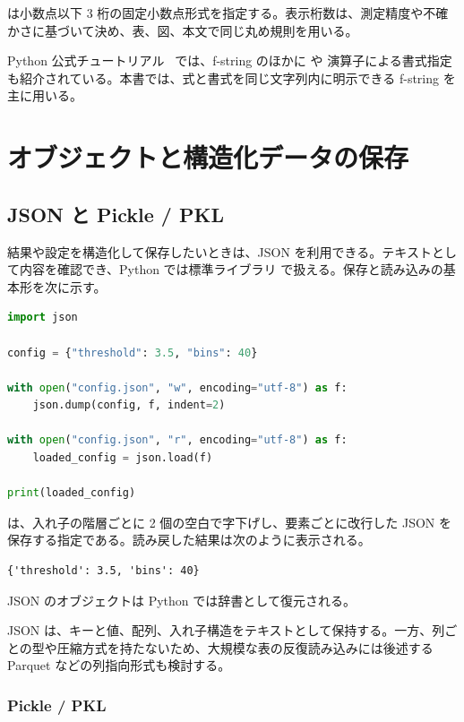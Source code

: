  は小数点以下 3 桁の固定小数点形式を指定する。表示桁数は、測定精度や不確かさに基づいて決め、表、図、本文で同じ丸め規則を用いる。

Python 公式チュートリアル~\cite{python_tutorial} では、f-string のほかに  や \code{\%} 演算子による書式指定も紹介されている。本書では、式と書式を同じ文字列内に明示できる f-string を主に用いる。

\section{オブジェクトと構造化データの保存}

\subsection{JSON と Pickle / PKL}

結果や設定を構造化して保存したいときは、JSON を利用できる。テキストとして内容を確認でき、Python では標準ライブラリ  で扱える。保存と読み込みの基本形を次に示す。

\begin{lstlisting}[language=Python]
import json

config = {"threshold": 3.5, "bins": 40}

with open("config.json", "w", encoding="utf-8") as f:
    json.dump(config, f, indent=2)

with open("config.json", "r", encoding="utf-8") as f:
    loaded_config = json.load(f)

print(loaded_config)
\end{lstlisting}

 は、入れ子の階層ごとに 2 個の空白で字下げし、要素ごとに改行した JSON を保存する指定である。読み戻した結果は次のように表示される。

\begin{lstlisting}[numbers=none, xleftmargin=2\zw]
{'threshold': 3.5, 'bins': 40}
\end{lstlisting}

JSON のオブジェクトは Python では辞書として復元される。

JSON は、キーと値、配列、入れ子構造をテキストとして保持する。一方、列ごとの型や圧縮方式を持たないため、大規模な表の反復読み込みには後述する Parquet などの列指向形式も検討する。

\subsubsection{Pickle / PKL}

